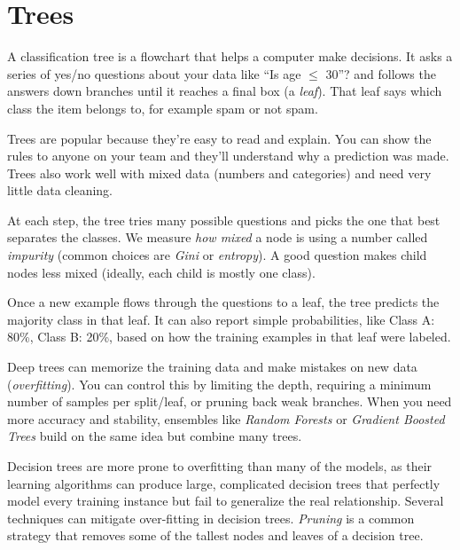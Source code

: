 \chapter{Trees}

A classification tree is a flowchart that helps a computer make decisions. It asks a series of yes/no questions about your data like ``Is age $\leq$ 30''? and follows the answers down branches until it reaches a final box (a \textit{leaf}). That leaf says which class the item belongs to, for example spam or not spam.

Trees are popular because they're easy to read and explain. You can show the rules to anyone on your team and they'll understand why a prediction was made. Trees also work well with mixed data (numbers and categories) and need very little data cleaning.

At each step, the tree tries many possible questions and picks the one that best separates the classes. We measure \textit{how mixed} a node is using a number called \textit{impurity} (common choices are \textit{Gini} or \textit{entropy}). A good question makes child nodes less mixed (ideally, each child is mostly one class).

Once a new example flows through the questions to a leaf, the tree predicts the majority class in that leaf. It can also report simple probabilities, like Class A: 80\%, Class B: 20\%, based on how the training examples in that leaf were labeled.

Deep trees can memorize the training data and make mistakes on new data (\textit{overfitting}). You can control this by limiting the depth, requiring a minimum number of samples per split/leaf, or pruning back weak branches. When you need more accuracy and stability, ensembles like \textit{Random Forests} or \textit{Gradient Boosted Trees} build on the same idea but combine many trees.

Decision trees are more prone to overfitting than many of the models, as their learning algorithms can produce large, complicated decision trees that perfectly model every training instance but fail to generalize the real relationship. Several techniques can mitigate over-fitting in decision trees. \textit{Pruning} is a common strategy that removes some of the tallest nodes and leaves of a decision tree. 


